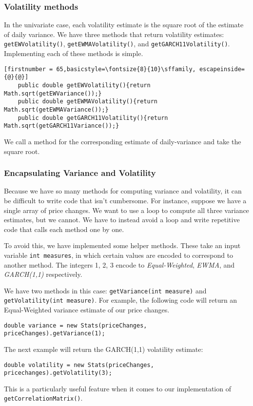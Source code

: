 \documentclass[../Dissertation.tex]{subfiles}
\begin{document}
\subsubsection{Volatility methods}

In the univariate case, each volatility estimate is the square root of the estimate of daily variance.
We have three methods that return volatility estimates: \lstinline|getEWVolatility()|, \lstinline|getEWMAVolatility()|, and \lstinline|getGARCH11Volatility()|.
Implementing each of these methods is simple.
\begin{lstlisting}[firstnumber = 65,basicstyle=\fontsize{8}{10}\sffamily, escapeinside={@}{@}]
    public double getEWVolatility(){return Math.sqrt(getEWVariance());}
    public double getEWMAVolatility(){return Math.sqrt(getEWMAVariance());}
    public double getGARCH11Volatility(){return Math.sqrt(getGARCH11Variance());}
\end{lstlisting}
We call a method for the corresponding estimate of daily-variance and take the square root.

\subsubsection{Encapsulating Variance and Volatility}

Because we have so many methods for computing variance and volatility, it can be difficult to write code that isn't cumbersome.
For instance, suppose we have a single array of price changes.
We want to use a loop to compute all three variance estimates, but we cannot.
We have to instead avoid a loop and write repetitive code that calls each method one by one.

To avoid this, we have implemented some helper methods.
These take an input variable \lstinline|int measures|, in which certain values are encoded to correspond to another method.
The integers 1, 2, 3 encode to \textit{Equal-Weighted}, \textit{EWMA},  and  \textit{GARCH(1,1)} respectively.

We have two methods in this case: \lstinline|getVariance(int measure)| and \lstinline|getVolatility(int measure)|.
For example, the following code will return an Equal-Weighted variance estimate of our price changes.
\begin{center}
	\lstinline|double variance = new Stats(priceChanges, priceChanges).getVariance(1);|
\end{center}
The next example will return the GARCH(1,1) volatility estimate:
\begin{center}
	\lstinline|double volatility = new Stats(priceChanges, pricechanges).getVolatility(3);|
\end{center}
This is a particularly useful feature when it comes to our implementation of \lstinline|getCorrelationMatrix()|.
\end{document}
